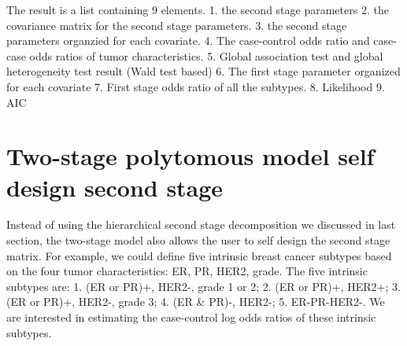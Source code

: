\documentclass[11pt,]{article}
\begin{document}
The result is a list containing 9 elements. 1. the second stage
parameters 2. the covariance matrix for the second stage parameters. 3.
the second stage parameters organzied for each covariate. 4. The
case-control odds ratio and case-case odds ratios of tumor
characteristics. 5. Global association test and global heterogeneity
test result (Wald test based) 6. The first stage parameter organized for
each covariate 7. First stage odds ratio of all the subtypes. 8.
Likelihood 9. AIC

\hypertarget{two-stage-polytomous-model-self-design-second-stage}{%
\section{Two-stage polytomous model self design second
stage}\label{two-stage-polytomous-model-self-design-second-stage}}

Instead of using the hierarchical second stage decomposition we
discussed in last section, the two-stage model also allows the user to
self design the second stage matrix. For example, we could define five
intrinsic breast cancer subtypes based on the four tumor
characteristics: ER, PR, HER2, grade. The five intrinsic subtypes are:
1. (ER or PR)+, HER2-, grade 1 or 2; 2. (ER or PR)+, HER2+; 3. (ER or
PR)+, HER2-, grade 3; 4. (ER \& PR)-, HER2-; 5. ER-PR-HER2-. We are
interested in estimating the case-control log odds ratios of these
intrinsic subtypes.
\end{document}
